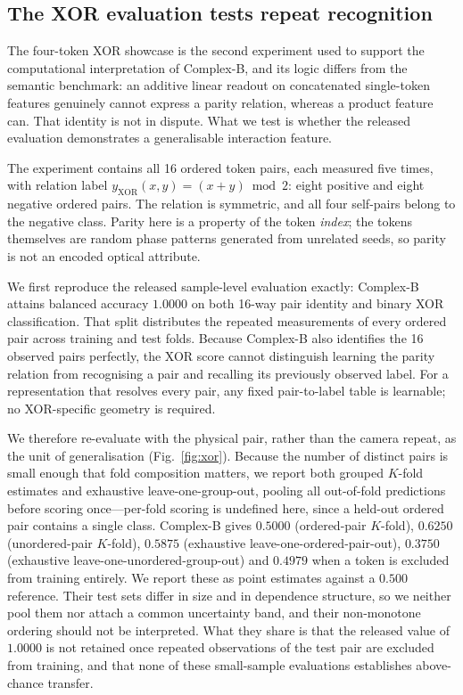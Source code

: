 \documentclass[11pt,a4paper]{article}
\begin{document}
\subsection{The XOR evaluation tests repeat recognition}
\label{sec:xor}

The four-token XOR showcase is the second experiment used to support the
computational interpretation of Complex-B, and its logic differs from the
semantic benchmark: an additive linear readout on concatenated single-token
features genuinely cannot express a parity relation, whereas a product feature
can. That identity is not in dispute. What we test is whether the released
evaluation demonstrates a generalisable interaction feature.

The experiment contains all 16 ordered token pairs, each measured five times,
with relation label $y_{\mathrm{XOR}}(x,y)=(x+y)\bmod 2$: eight positive and
eight negative ordered pairs. The relation is symmetric, and all four
self-pairs belong to the negative class. Parity here is a property of the
token \emph{index}; the tokens themselves are random phase patterns generated
from unrelated seeds, so parity is not an encoded optical attribute.

We first reproduce the released sample-level evaluation exactly: Complex-B
attains balanced accuracy $1.0000$ on both 16-way pair identity and binary XOR
classification. That split distributes the repeated measurements of every
ordered pair across training and test folds. Because Complex-B also identifies
the 16 observed pairs perfectly, the XOR score cannot distinguish learning the
parity relation from recognising a pair and recalling its previously observed
label. For a representation that resolves every pair, any fixed pair-to-label
table is learnable; no XOR-specific geometry is required.

We therefore re-evaluate with the physical pair, rather than the camera
repeat, as the unit of generalisation (Fig.~\ref{fig:xor}). Because the number
of distinct pairs is small enough that fold composition matters, we report
both grouped $K$-fold estimates and exhaustive leave-one-group-out, pooling
all out-of-fold predictions before scoring once---per-fold scoring is
undefined here, since a held-out ordered pair contains a single class.
Complex-B gives $0.5000$ (ordered-pair $K$-fold), $0.6250$ (unordered-pair
$K$-fold), $0.5875$ (exhaustive leave-one-ordered-pair-out), $0.3750$
(exhaustive leave-one-unordered-group-out) and $0.4979$ when a token is
excluded from training entirely. We report these as point estimates against a
$0.500$ reference. Their test sets differ in size and in dependence structure,
so we neither pool them nor attach a common uncertainty band, and their
non-monotone ordering should not be interpreted. What they share is that the
released value of $1.0000$ is not retained once repeated observations of the
test pair are excluded from training, and that none of these small-sample
evaluations establishes above-chance transfer.
\end{document}

